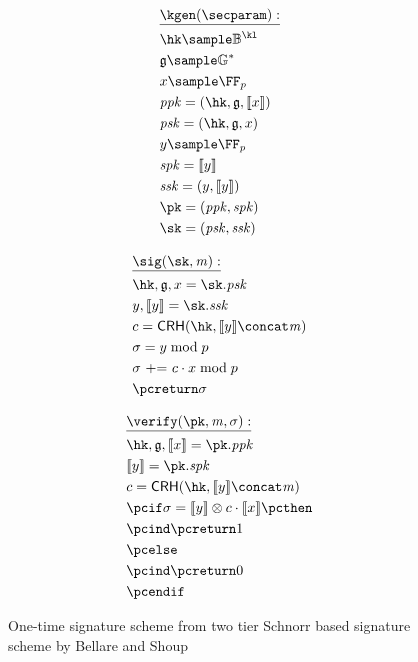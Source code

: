 \begin{figure*}[ht]
    \begin{minipage}[t]{0.33\textwidth}
        \begin{align*}
            & \underline{\kgen(\secparam):} \\
            & \hk \sample \BB^{\kl} \\
            & \ggen \sample \gset^* \\
            & x \sample \FFx{p} \\
            & \ppk = (\hk, \ggen, \groupenc{x}) \\
            & \psk = (\hk, \ggen, x) \\
            & y \sample \FFx{p} \\
            & \spk =  \groupenc{y} \\
            & \ssk = (y, \groupenc{y}) \\
            & \pk = (\ppk, \spk) \\
            & \sk = (\psk, \ssk) \\
        \end{align*}
    \end{minipage}%
    \begin{minipage}[t]{0.33\textwidth}
        \begin{align*}
            & \underline{\sig(\sk, \msg):}\\
            & \hk, \ggen, x = \sk.\psk \\
            & y, \groupenc{y} = \sk.\ssk \\
            & c = \crh(\hk, \groupenc{y} \concat \msg) \\
            & \sigma = y \bmod p \\
            & \sigma\ \text{+=}\ c \cdot x \bmod p \\
            & \pcreturn \sigma
        \end{align*}
    \end{minipage}%
    \begin{minipage}[t]{0.33\textwidth}
        \begin{align*}
        & \underline{\verify(\pk, \msg, \sigma):}\\
        &  \hk, \ggen, \groupenc{x} = \pk.\ppk \\
        &  \groupenc{y} = \pk.\spk \\
        &  c = \crh(\hk, \groupenc{y} \concat \msg)\\
        &  \pcif \sigma = \groupenc{y} \otimes c \cdot \groupenc{x} \pcthen \\
        &  \pcind \pcreturn 1\\
        &  \pcelse\\
        &  \pcind \pcreturn 0\\
        &  \pcendif
        \end{align*}
    \end{minipage}
\caption{One-time signature scheme from two tier Schnorr based signature scheme by Bellare and Shoup~\cite{bellare2007two}}\label{instantiation:fig:ots-from-two-tier-sig}
\end{figure*}

